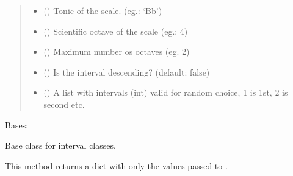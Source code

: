 \documentclass[letterpaper,10pt,english]{sphinxmanual}
\begin{document}
\begin{fulllineitems}
\begin{fulllineitems}
\begin{quote}
\begin{description}
\begin{itemize}
\item {} 
 () \textendash{} Tonic of the scale. (eg.: ‘Bb’)

\item {} 
 () \textendash{} Scientific octave of the scale (eg.: 4)

\item {} 
 () \textendash{} Maximum number os octaves (eg. 2)

\item {} 
 () \textendash{} Is the interval descending? (default: false)

\item {} 
 () \textendash{} A list with intervals (int) valid for random
choice, 1 is 1st, 2 is second etc.

\end{itemize}

\end{description}\end{quote}

\end{fulllineitems}


\end{fulllineitems}


\begin{fulllineitems}
\label{\detokenize{birdears:birdears.interval.IntervalBase}}
Bases: 

\begin{fulllineitems}
\label{\detokenize{birdears:birdears.interval.IntervalBase.__init__}}
Base class for interval classes.

\end{fulllineitems}


\begin{fulllineitems}
\label{\detokenize{birdears:birdears.interval.IntervalBase.return_simple}}
This method returns a dict with only the values passed to .

\end{fulllineitems}


\end{fulllineitems}
\end{document}
